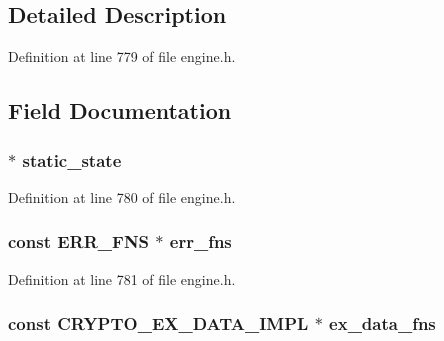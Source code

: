 \subsection{Detailed Description}


Definition at line 779 of file engine.\+h.



\subsection{Field Documentation}
\subsubsection[{\texorpdfstring{static\+\_\+state}{static_state}}]{ $\ast$ static\+\_\+state}\hypertarget{structst__dynamic__fns_a6122a12b836a720e29b301da5a372454}{}\label{structst__dynamic__fns_a6122a12b836a720e29b301da5a372454}


Definition at line 780 of file engine.\+h.

\subsubsection[{\texorpdfstring{err\+\_\+fns}{err_fns}}]{\setlength{\rightskip}{0pt plus 5cm}const {\bf E\+R\+R\+\_\+\+F\+NS} $\ast$ err\+\_\+fns}\hypertarget{structst__dynamic__fns_a9c7ca79338e99c91dbc050e8e2b744b6}{}\label{structst__dynamic__fns_a9c7ca79338e99c91dbc050e8e2b744b6}


Definition at line 781 of file engine.\+h.

\subsubsection[{\texorpdfstring{ex\+\_\+data\+\_\+fns}{ex_data_fns}}]{\setlength{\rightskip}{0pt plus 5cm}const {\bf C\+R\+Y\+P\+T\+O\+\_\+\+E\+X\+\_\+\+D\+A\+T\+A\+\_\+\+I\+M\+PL} $\ast$ ex\+\_\+data\+\_\+fns}\hypertarget{structst__dynamic__fns_a7c30961d2a84d87eb7232f1dd1a58082}{}\label{structst__dynamic__fns_a7c30961d2a84d87eb7232f1dd1a58082}


